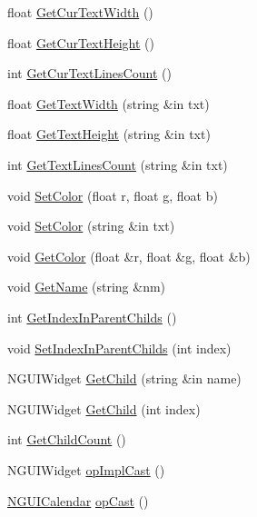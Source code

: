 \begin{DoxyCompactItemize}
float \hyperlink{class_n_g_u_i_calendar_ac099efe37148658baa46975efe7d1161}{Get\+Cur\+Text\+Width} ()
\item 
float \hyperlink{class_n_g_u_i_calendar_a53c12e0a021925c29825f47998bfedb9}{Get\+Cur\+Text\+Height} ()
\item 
int \hyperlink{class_n_g_u_i_calendar_ad149a12c8425598c1c65562caf1ef61f}{Get\+Cur\+Text\+Lines\+Count} ()
\item 
float \hyperlink{class_n_g_u_i_calendar_a2005e7bbd16a3053203d196dd7d78adf}{Get\+Text\+Width} (string \&in txt)
\item 
float \hyperlink{class_n_g_u_i_calendar_a44e0dd6874983d3c6053d8ad9c2d23ec}{Get\+Text\+Height} (string \&in txt)
\item 
int \hyperlink{class_n_g_u_i_calendar_a14e4f05da25580392c134b88cd02d9f2}{Get\+Text\+Lines\+Count} (string \&in txt)
\item 
void \hyperlink{class_n_g_u_i_calendar_ac95b42a051fad2ac32595e9a9580600b}{Set\+Color} (float r, float g, float b)
\item 
void \hyperlink{class_n_g_u_i_calendar_a42e61a8b56bd173c6bab49329cd68c2c}{Set\+Color} (string \&in txt)
\item 
void \hyperlink{class_n_g_u_i_calendar_ac877db8547c81c63eccc75ed7c5656e5}{Get\+Color} (float \&r, float \&g, float \&b)
\item 
void \hyperlink{class_n_g_u_i_calendar_af7c4b281b93c9a8f68befd9f1a0530e8}{Get\+Name} (string \&nm)
\item 
int \hyperlink{class_n_g_u_i_calendar_a8e19cf910502f551d7b129e80756040b}{Get\+Index\+In\+Parent\+Childs} ()
\item 
void \hyperlink{class_n_g_u_i_calendar_a76dcad18fb7454a9dfae73d0c913af3e}{Set\+Index\+In\+Parent\+Childs} (int index)
\item 
N\+G\+U\+I\+Widget \hyperlink{class_n_g_u_i_calendar_a12b45acbf5be8dd475fa9dc47efb0e5a}{Get\+Child} (string \&in name)
\item 
N\+G\+U\+I\+Widget \hyperlink{class_n_g_u_i_calendar_a4cb0fa2fde73992b9f7c42f071f484bb}{Get\+Child} (int index)
\item 
int \hyperlink{class_n_g_u_i_calendar_aa17d04f3ef60ac010eae4fdb667336ab}{Get\+Child\+Count} ()
\item 
N\+G\+U\+I\+Widget \hyperlink{class_n_g_u_i_calendar_af9fa370e273ee3aa4a55bb35f65f2546}{op\+Impl\+Cast} ()
\item 
\hyperlink{class_n_g_u_i_calendar}{N\+G\+U\+I\+Calendar} \hyperlink{class_n_g_u_i_calendar_ab7f8e0c9bab98e7570fa18e3339df492}{op\+Cast} ()

\end{DoxyCompactItemize}
